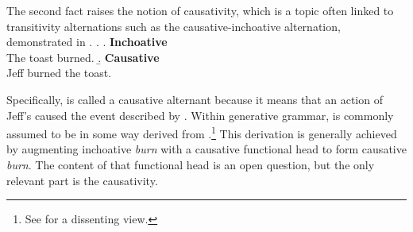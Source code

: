 \documentclass[MilwayThesis]{subfiles}
\begin{document}
The second fact raises the notion of causativity, which is a topic often linked to transitivity alternations such as the causative-inchoative alternation, demonstrated in \Next.
\ex.
\a. \textbf{Inchoative}\\
The toast burned.
\b. \textbf{Causative}\\
Jeff burned the toast.

Specifically, \Last[b] is called a causative alternant because it means that an action of Jeff's caused the event described by \Last[b].
Within generative grammar, \Last[b] is commonly assumed to be in some way derived from \Last[a].\footnote{
  See \textcite{fodor1970three} for a dissenting view.
}
This derivation is generally achieved by augmenting inchoative \textit{burn} with a causative functional head to form causative \textit{burn}.
The content of that functional head is an open question, but the only relevant part is the causativity.
\end{document}

